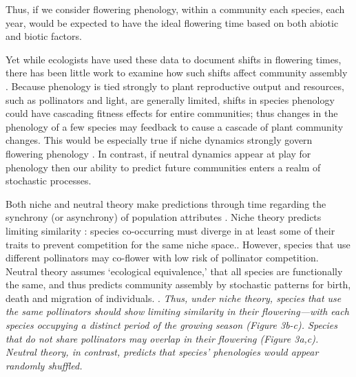 Thus, if we consider flowering phenology, within a community each species, each year, would be expected to have the ideal flowering time based on both abiotic and biotic factors. 


Yet while ecologists have used these data to document shifts in flowering times, there has been little work to examine how such shifts affect community assembly \citep{wolkovich:2010fee}. Because phenology is tied strongly to plant reproductive output and resources, such as pollinators and light, are generally limited, shifts in species phenology could have cascading fitness effects for entire communities; thus changes in the phenology of a few species may feedback to cause a cascade of plant community changes. This would be especially true if niche dynamics strongly govern flowering phenology \citep{gotelli1996}. In contrast, if neutral dynamics appear at play for phenology then our ability to predict future communities enters a realm of stochastic processes.



Both niche and neutral theory make predictions through time regarding the synchrony (or asynchrony) of population attributes \citep{Houlahan:2007qy,Vergnon:2009bh}. Niche theory predicts limiting similarity \citep{ABRAMS:1980dq}: species co-occurring must diverge in at least some of their traits to prevent competition for the same niche space.. However, species that use different pollinators may co-flower with low risk of pollinator competition. Neutral theory assumes `ecological equivalence,' that all species are functionally the same, and thus predicts community assembly by stochastic patterns for birth, death and migration of individuals. \citep{Hubbell:2001vo}. \emph{Thus, under niche theory, species that use the same pollinators should show limiting similarity in their flowering---with each species occupying a distinct period of the growing season (Figure 3b-c). Species that do not share pollinators may overlap in their flowering (Figure 3a,c). Neutral theory, in contrast, predicts that species' phenologies would appear randomly shuffled.}


